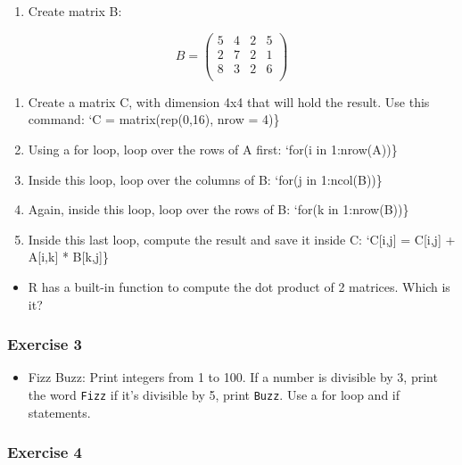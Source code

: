 \documentclass[]{gitbook}
\providecommand{\tightlist}{%
  \setlength{\itemsep}{0pt}\setlength{\parskip}{0pt}}
\theoremstyle{definition}
\theoremstyle{definition}
\theoremstyle{definition}
\theoremstyle{remark}
\begin{document}
\begin{enumerate}
\def\labelenumi{\arabic{enumi})}
\setcounter{enumi}{1}
\tightlist
\item
  Create matrix B:
\end{enumerate}

\[B = \left(
\begin{array}{cccc}
 5 & 4 & 2 & 5 \\
 2 & 7 & 2 & 1 \\
 8 & 3 & 2 & 6 \\
\end{array} \right)
\]

\begin{enumerate}
\def\labelenumi{\arabic{enumi})}
\setcounter{enumi}{2}
\item
  Create a matrix C, with dimension 4x4 that will hold the result. Use
  this command: `C = matrix(rep(0,16), nrow = 4)\}
\item
  Using a for loop, loop over the rows of A first: `for(i in
  1:nrow(A))\}
\item
  Inside this loop, loop over the columns of B: `for(j in 1:ncol(B))\}
\item
  Again, inside this loop, loop over the rows of B: `for(k in
  1:nrow(B))\}
\item
  Inside this last loop, compute the result and save it inside C:
  `C{[}i,j{]} = C{[}i,j{]} + A{[}i,k{]} * B{[}k,j{]}\}
\end{enumerate}

\begin{itemize}
\tightlist
\item
  R has a built-in function to compute the dot product of 2 matrices.
  Which is it?
\end{itemize}

\hypertarget{exercise-3-3}{%
\subsubsection*{Exercise 3}\label{exercise-3-3}}

\begin{itemize}
\tightlist
\item
  Fizz Buzz: Print integers from 1 to 100. If a number is divisible by
  3, print the word \texttt{Fizz} if it's divisible by 5, print
  \texttt{Buzz}. Use a for loop and if statements.
\end{itemize}

\hypertarget{exercise-4-1}{%
\subsubsection*{Exercise 4}\label{exercise-4-1}}
\end{document}
